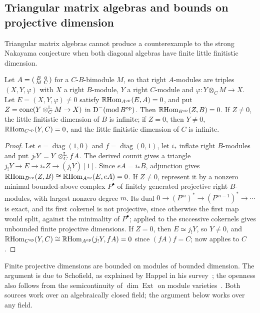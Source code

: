 \subsection{Triangular matrix algebras and bounds on projective dimension}
\label{subsec:gluing}

Triangular matrix algebras cannot produce a counterexample to the strong
Nakayama conjecture when both
diagonal algebras have finite little finitistic dimension.

\begin{proposition}
  \label{prop:triangular}
  Let ${A=\begin{psmallmatrix}B&0\\M&C\end{psmallmatrix}}$ for a $C$-$B$-bimodule
  $M$, so that right $A$-modules are triples $(X,Y,\varphi)$ with $X$ a right
  $B$-module, $Y$ a right $C$-module and ${\varphi\colon Y\otimes_CM\to X}$. Let
  ${E=(X,Y,\varphi)\neq0}$ satisfy ${\RHom[A^{\op}]{E}{A}=0}$, and put
  ${Z=\operatorname{cone}(Y\Lotimes[C]M\to X)}$ in
  ${\DerCat[-]{\operatorname{mod}B^{\op}}}$.
  Then ${\RHom[B^{\op}]{Z}{B}=0}$. If ${Z\neq0}$, the little finitistic dimension of
  $B$ is infinite; if ${Z=0}$, then ${Y\neq0}$, ${\RHom[C^{\op}]{Y}{C}=0}$, and the
  little finitistic dimension of $C$ is infinite.
\end{proposition}

\begin{proof}
  Let ${e=\operatorname{diag}(1,0)}$ and ${f=\operatorname{diag}(0,1)}$, let $i_*$
  inflate right $B$-modules and put ${j_!Y=Y\Lotimes[C]fA}$. The derived counit
  gives
  a triangle ${j_!Y\to E\to i_*Z\to(j_!Y)[1]}$. Since ${eA=i_*B}$, adjunction gives
  ${\RHom[B^{\op}]{Z}{B}\cong\RHom[A^{\op}]{E}{eA}=0}$. If ${Z\neq0}$, represent it
  by a nonzero minimal bounded-above complex ${P^\bullet}$ of finitely generated
  projective right $B$-modules, with largest nonzero degree $m$. Its dual
  ${0\to(P^m)^*\to(P^{m-1})^*\to\cdots}$ is exact, and its first cokernel is not
  projective, since otherwise the first map would split, against the
  minimality of ${P^\bullet}$;  applied to the successive
  cokernels gives unbounded finite projective dimensions. If ${Z=0}$, then
  ${E\simeq j_!Y}$, so ${Y\neq0}$, and
  ${\RHom[C^{\op}]{Y}{C}\cong\RHom[A^{\op}]{j_!Y}{fA}=0}$ since ${(fA)f=C}$; now
   applies to $C$.
\end{proof}

Finite projective dimensions are bounded on modules of bounded
dimension. The argument is due to Schofield, as explained by Happel in his
survey~\cite[Section~2.3]{Hap90}; the openness also follows from the
semicontinuity of $\dim\operatorname{Ext}$ on module
varieties~\cite[Corollary~2.6]{GLS24}. Both sources work over an algebraically
closed field; the argument below works over any field.

